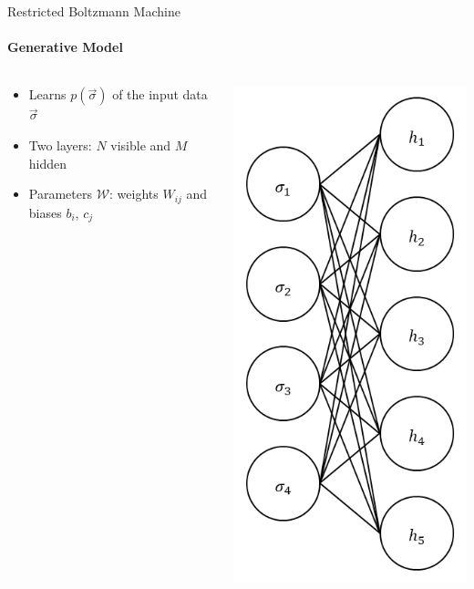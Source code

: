 \documentclass{beamer}
\begin{document}
\begin{frame}{Restricted Boltzmann Machine}
\framesubtitle{Generative Model}
\begin{columns}
\begin{column}{0.68\textwidth}
\begin{itemize}
    \item Learns $p(\vec{\sigma})$ of the input data $\vec{\sigma}$
    \item Two layers: $N$ visible and $M$ hidden
    \item Parameters $\mathcal{W}$: weights $W_{ij}$ and biases $b_i$, $c_j$
\end{itemize}
\end{column}
\begin{column}{0.3\textwidth}
\begin{center}
    \includegraphics[height=\textheight]{images/rbm.png}
\end{center}
\end{column}
\end{columns}
\end{frame}
\end{document}
